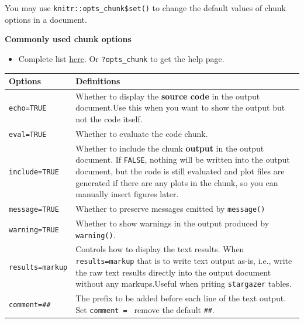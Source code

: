 \documentclass[
]{book}
\providecommand{\tightlist}{%
  \setlength{\itemsep}{0pt}\setlength{\parskip}{0pt}}
\begin{document}
You may use \texttt{knitr::opts\_chunk\$set()} to change the default values of chunk options in a document.

\textbf{Commonly used chunk options}

\begin{itemize}
\tightlist
\item
  Complete list \href{https://yihui.org/knitr/options/}{here}. Or \texttt{?opts\_chunk} to get the help page.
\end{itemize}

\begin{longtable}[]{@{}
  >{\raggedright\arraybackslash}p{}
  >{\raggedright\arraybackslash}p{}@{}}
\toprule\noalign{}
\begin{minipage}[b]{\linewidth}\raggedright
Options
\end{minipage} & \begin{minipage}[b]{\linewidth}\raggedright
Definitions
\end{minipage} \\
\midrule\noalign{}
\endhead
\bottomrule\noalign{}
\endlastfoot
\texttt{echo=TRUE} & Whether to display the \textbf{source code} in the output document.Use this when you want to show the output but not the code itself. \\
\texttt{eval=TRUE} & Whether to evaluate the code chunk. \\
\texttt{include=TRUE} & Whether to include the {chunk \textbf{output}} in the output document. If \texttt{FALSE}, nothing will be written into the output document, but the code is still evaluated and plot files are generated if there are any plots in the chunk, so you can manually insert figures later. \\
\texttt{message=TRUE} & Whether to preserve messages emitted by \texttt{message()} \\
\texttt{warning=TRUE} & Whether to show warnings in the output produced by \texttt{warning()}. \\
\texttt{results=\textquotesingle{}markup\textquotesingle{}} & Controls how to display the text results. When \texttt{results=\textquotesingle{}markup\textquotesingle{}} that is to write text output as-is, i.e., write the raw text results directly into the output document without any markups.Useful when priting \texttt{stargazer} tables. \\
\texttt{comment=\textquotesingle{}\#\#\textquotesingle{}} & The prefix to be added before each line of the text output. Set \texttt{comment\ =\ \textquotesingle{}\textquotesingle{}} remove the default \texttt{\#\#}. \\

\end{longtable}
\end{document}
